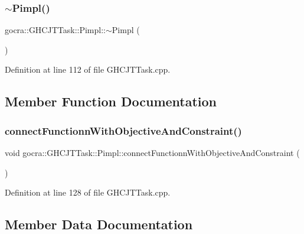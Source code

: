 \subsubsection{\texorpdfstring{$\sim$\+Pimpl()}{~Pimpl()}}
{\footnotesize\ttfamily gocra\+::\+G\+H\+C\+J\+T\+Task\+::\+Pimpl\+::$\sim$\+Pimpl (\begin{DoxyParamCaption}{ }\end{DoxyParamCaption})\hspace{0.3cm}{\ttfamily [inline]}}



Definition at line 112 of file G\+H\+C\+J\+T\+Task.\+cpp.



\subsection{Member Function Documentation}
\hypertarget{structgocra_1_1GHCJTTask_1_1Pimpl_aeedb4e2ac7e5dc4b68655b124ee8ed58}{}\label{structgocra_1_1GHCJTTask_1_1Pimpl_aeedb4e2ac7e5dc4b68655b124ee8ed58} 
\subsubsection{\texorpdfstring{connect\+Functionn\+With\+Objective\+And\+Constraint()}{connectFunctionnWithObjectiveAndConstraint()}}
{\footnotesize\ttfamily void gocra\+::\+G\+H\+C\+J\+T\+Task\+::\+Pimpl\+::connect\+Functionn\+With\+Objective\+And\+Constraint (\begin{DoxyParamCaption}{ }\end{DoxyParamCaption})\hspace{0.3cm}{\ttfamily [inline]}}



Definition at line 128 of file G\+H\+C\+J\+T\+Task.\+cpp.



\subsection{Member Data Documentation}
\hypertarget{structgocra_1_1GHCJTTask_1_1Pimpl_a71d5221274d0ee84040992042d609cec}{}\label{structgocra_1_1GHCJTTask_1_1Pimpl_a71d5221274d0ee84040992042d609cec} 

